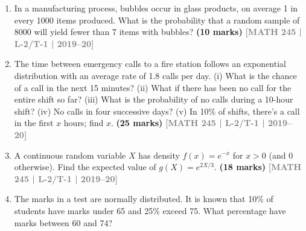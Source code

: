 \documentclass[12pt,a4paper]{article}
\newcommand{\yr}[1]{\hfill\textcolor{gray}{\small\textbf{[#1]}}}
\newcommand{\mk}[1]{\textcolor{orange!70!black}{\small\textbf{(#1 marks)}}}
\begin{document}
\begin{enumerate}
\mk{18} \yr{MATH 245 | L-2/T-1 | 2020--21}

\item In a manufacturing process, bubbles occur in glass products, on average 1 in every 1000 items produced. What is the probability that a random sample of 8000 will yield fewer than 7 items with bubbles?
\mk{10} \yr{MATH 245 | L-2/T-1 | 2019--20}

\item The time between emergency calls to a fire station follows an exponential distribution with an average rate of 1.8 calls per day. (i) What is the chance of a call in the next 15 minutes? (ii) What if there has been no call for the entire shift so far? (iii) What is the probability of no calls during a 10-hour shift? (iv) No calls in four successive days? (v) In 10\% of shifts, there's a call in the first $x$ hours; find $x$.
\mk{25} \yr{MATH 245 | L-2/T-1 | 2019--20}

\item A continuous random variable $X$ has density $f(x)=e^{-x}$ for $x>0$ (and 0 otherwise). Find the expected value of $g(X)=e^{2X/3}$.
\mk{18} \yr{MATH 245 | L-2/T-1 | 2019--20}

\item The marks in a test are normally distributed. It is known that 10\% of students have marks under 65 and 25\% exceed 75. What percentage have marks between 60 and 74?

\begin{center}
\end{center}


\end{enumerate}
\end{document}
